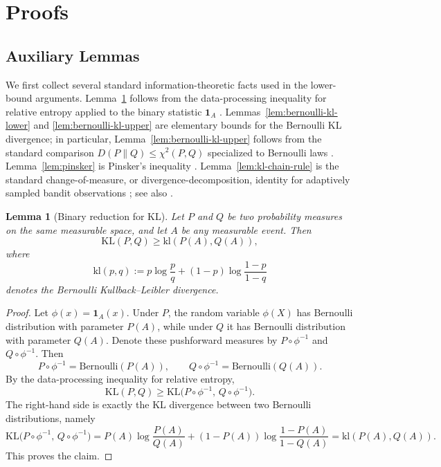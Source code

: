 \documentclass[
  12pt]{article}
\newtheorem{lemma}{Lemma}
\begin{document}
\section{Proofs}
\subsection{Auxiliary Lemmas}\label{sec: Auxiliary Lemmas}

We first collect several standard information-theoretic facts used in the lower-bound
arguments. Lemma~\ref{lem:binary-reduction} follows from the data-processing inequality for relative entropy
applied to the binary statistic \(\mathbf{1}_A\)
\parencite[see, e.g.,][]{coverThomas2006,lattimoreSzepesvari2020}.
Lemmas~\ref{lem:bernoulli-kl-lower} and \ref{lem:bernoulli-kl-upper} are elementary bounds for the Bernoulli KL divergence; in particular,
Lemma~\ref{lem:bernoulli-kl-upper} follows from the standard comparison \(D(P\|Q)\le \chi^2(P,Q)\) specialized
to Bernoulli laws \parencite[see, e.g.,][]{tsybakov2009,lattimoreSzepesvari2020}.
Lemma~\ref{lem:pinsker} is Pinsker's inequality \parencite{pinsker1964,tsybakov2009}. Lemma~\ref{lem:kl-chain-rule} is the
standard change-of-measure, or divergence-decomposition, identity for adaptively sampled
bandit observations \parencite[see, e.g., Lemma~1 of][]{KaufmannCappeGarivier2016};
see also \textcite[Chapter~15]{lattimoreSzepesvari2020}.

\begin{lemma}[Binary reduction for KL]
\label{lem:binary-reduction}
Let $P$ and $Q$ be two probability measures on the same measurable space, and
let $A$ be any measurable event. Then
\[
\mathrm{KL}(P,Q)\ge \mathrm{kl}(P(A),Q(A)),
\]
where
\[
\mathrm{kl}(p,q):=p\log\frac pq+(1-p)\log\frac{1-p}{1-q}
\]
denotes the Bernoulli Kullback--Leibler divergence.
\end{lemma}

\begin{proof}
Let \(\phi(x)=\mathbf 1_A(x)\). Under \(P\), the random variable \(\phi(X)\) has
Bernoulli distribution with parameter \(P(A)\), while under \(Q\) it has
Bernoulli distribution with parameter \(Q(A)\). Denote these pushforward
measures by \(P\circ\phi^{-1}\) and \(Q\circ\phi^{-1}\). Then
\[
P\circ\phi^{-1}=\mathrm{Bernoulli}(P(A)),
\qquad
Q\circ\phi^{-1}=\mathrm{Bernoulli}(Q(A)).
\]
By the data-processing inequality for relative entropy,
\[
\mathrm{KL}(P,Q)
\ge
\mathrm{KL}\bigl(P\circ\phi^{-1},\,Q\circ\phi^{-1}\bigr).
\]
The right-hand side is exactly the KL divergence between two Bernoulli
distributions, namely
\[
\mathrm{KL}\bigl(P\circ\phi^{-1},\,Q\circ\phi^{-1}\bigr)
=
P(A)\log\frac{P(A)}{Q(A)}
+
(1-P(A))\log\frac{1-P(A)}{1-Q(A)}
=
\mathrm{kl}(P(A),Q(A)).
\]
This proves the claim.
\end{proof}
\end{document}
